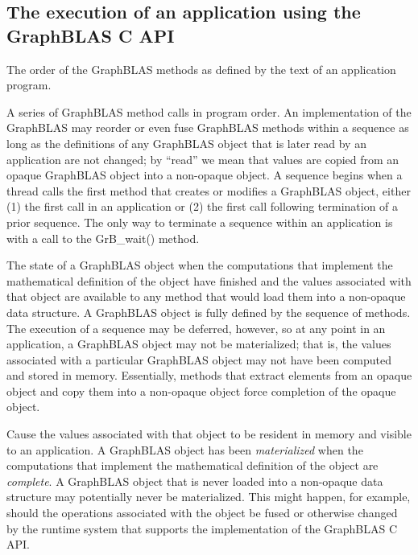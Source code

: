 \subsection{The execution of an application using the GraphBLAS C API}
\glossBegin
{} The order of the GraphBLAS methods as defined by the 
text of an application program.

 A series of GraphBLAS method calls in program order.  
An implementation of the GraphBLAS may reorder or even fuse GraphBLAS methods within a 
sequence as long as the definitions of any GraphBLAS object that is later read by an application 
are not changed; by ``read'' we mean that values are copied from an opaque GraphBLAS 
object into a non-opaque object.  A sequence begins when a thread calls the first method that creates
or modifies a GraphBLAS object, either (1) the first call in an application or (2) the first call 
following termination of a prior sequence.  The only way to terminate a sequence within an 
application is with a call to the {\sf GrB\_wait()} method. 


 The state of a GraphBLAS object when the computations that 
implement the mathematical definition of the object have finished and the values 
associated with that object are available to any method that would load them 
into a non-opaque data structure.   
A GraphBLAS object is fully defined by the sequence of methods.   
The execution of a sequence may be deferred, however, so at any point 
in an application, a GraphBLAS object may not be materialized; that is, 
the values associated with a particular GraphBLAS object may not have 
been computed and stored in memory.   Essentially, methods that extract elements 
from an opaque object and copy them into a non-opaque object force completion of the
opaque object. 

 Cause the values associated with that object to be resident 
in memory and visible to an application.  A GraphBLAS object has been 
\emph{materialized} when the computations that implement the mathematical definition 
of the object are {\it complete}. 
A GraphBLAS object that is never loaded into a non-opaque data structure may 
potentially never be materialized.  This might happen, for  example, should the operations 
associated with the object be fused or otherwise changed by the runtime system 
that supports the implementation of the GraphBLAS C API.   

